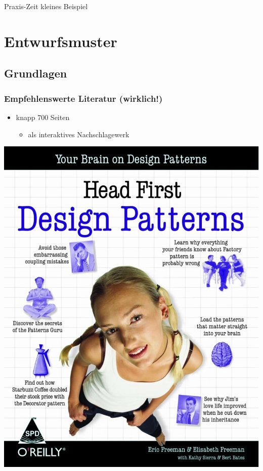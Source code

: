 \documentclass[18pt]{beamer}
\begin{document}
\begin{frame}{Praxis-Zeit}
	\huge \centering kleines Beispiel
\end{frame}

\section{Entwurfsmuster}
	\subsection{Grundlagen}
	\begin{frame}
		\frametitle{Empfehlenswerte Literatur (wirklich!)}
		\begin{itemize}
			\item knapp 700 Seiten
			\begin{itemize}
				\item als interaktives Nachschlagewerk
			\end{itemize}
		\end{itemize}
		\centering
		\includegraphics[scale=0.15]{./pics/tut3/literature.jpg}
	\end{frame}
		
\end{document}
